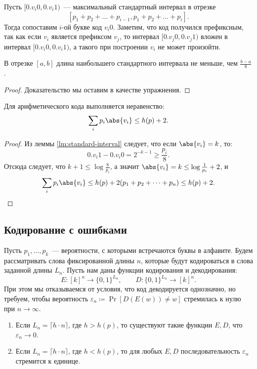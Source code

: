 Пусть $[0.v_i0, 0.v_i1)$~--- максимальный стандартный интервал в отрезке
$$
[p_1 + p_2 + \dots + p_{i - 1}, p_1 + p_2 + \dots + p_{i}].
$$ 
Тогда сопоставим $i$-ой букве код $v_i0$. Заметим, что код получился префиксным, так как если $v_i$
является префиксом $v_j$, то интервал $[0.v_j0, 0.v_j1)$ вложен в интервал $[0.v_i0, 0.v_i1)$, а такого
при построении $ v_i $ не может произойти.

\begin{lemma}
    \label{lm:standard-interval}
    В отрезке $[a, b]$ длина наибольшего стандартного интервала не меньше, чем $\frac{b - a}{8}$.
\end{lemma}
\begin{proof}
    Доказательство мы оставим в качестве упражнения.
\end{proof}

\begin{proposition}
    Для арифметического кода выполняется неравенство:
    $$
        \sum_i p_i\abs{v_i}\le h(p)+2.
    $$
\end{proposition}
\begin{proof}
    Из леммы \ref{lm:standard-interval} следует, что если $\abs{v_i} = k$, то:
    $$
    0.v_i1 - 0.v_i0 = 2^{-k-1}  \ge \frac {p_i}{8}.
    $$ 
    Отсюда следует, что ${k + 1} \le \log \frac{8}{p_i}$, а значит
    $\abs{v_i} = k \le \log\frac{1}{p_i} + 2$, и
    $$
        \sum_i p_i \abs{v_i} \le h(p) + 2(p_1 + p_2 + \dots + p_n) \le h(p) + 2.
    $$
\end{proof}


\subsection{Кодирование с ошибками}

Пусть $p_1, \dots, p_k $~--- вероятности, с которыми встречаются буквы в алфавите. Будем рассматривать
слова фиксированной длины $n$, которые будут кодироваться в слова заданной длины $L_n$. Пусть нам даны
функции кодирования и декодирования:
$$
    E\colon [k]^n \to \{0, 1\}^{L_n}, \qquad D\colon \{0, 1\}^{L_n} \to [k]^n.
$$
При этом мы отказываемся от условия, что код декодируется однозначно, но требуем, чтобы вероятность
$  
\varepsilon_n \coloneqq \Pr[D(E(w)) \ne w]$ стремилась к нулю при $n \to \infty$.

\begin{theorem}[Шеннон]
    \begin{enumerate}
        \item Если $ L_n = \lceil h\cdot n\rceil$, где $h > h(p)$, то существуют такие функции $E, D$,
            что $\varepsilon_n \to 0$.
        \item Если $L_n = \lceil h \cdot n \rceil$, где $h < h(p)$, то для любых $E, D$
            последовательность $\varepsilon_n$ стремится к единице.
    \end{enumerate}
\end{theorem}

